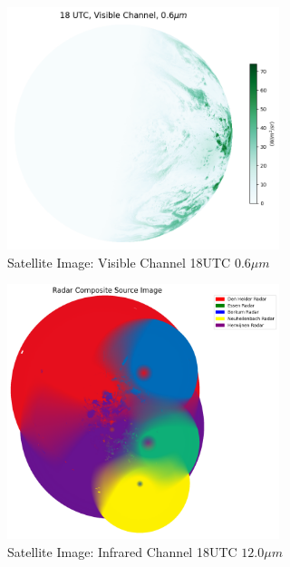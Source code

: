 \documentclass[acmtog, authorversion]{acmart}
\begin{document}
\begin{figure}
    \centering
    \includegraphics[width=225pt]{./images/vis_006.png}
    \caption{Satellite Image: Visible Channel 18UTC $0.6\mu m$}
    \Description{}
    \label{fig:vis}
\end{figure}

\begin{figure}
    \centering
    \includegraphics[width=225pt]{./images/radar_source.png}
    \caption{Satellite Image: Infrared Channel 18UTC $12.0\mu m$}
    \Description{}
    \label{fig:source}
\end{figure}
\end{document}
